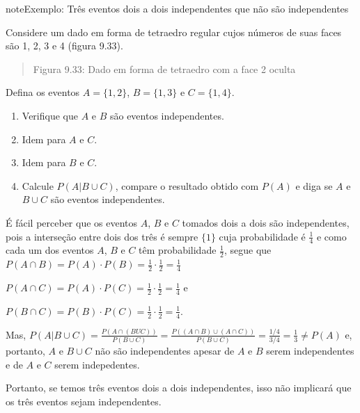 \begin{sphinxadmonition}{note}{Exemplo: Três eventos dois a dois independentes que não são independentes}

Considere um dado em forma de tetraedro regular cujos números de suas faces são 1, 2, 3 e 4 (figura 9.33).
\begin{quote}
\label{\detokenize{PE511-7:id4}}
\begin{figure}[H]
\centering

\noindent{}
\label{\detokenize{PE511-7:id4}}\end{figure}

Figura 9.33: Dado em forma de tetraedro com a face 2 oculta
\end{quote}

Defina os eventos \(A=\{1,2\}\), \(B=\{1,3\}\) e \(C=\{1,4\}\).
\begin{enumerate}
\item {} 
Verifique que \(A\) e \(B\)  são eventos independentes.

\item {} 
Idem para \(A\) e \(C\).

\item {} 
Idem para \(B\) e \(C\).

\item {} 
Calcule \(P(A|B\cup C)\), compare o resultado obtido com \(P(A)\) e diga se \(A\) e \(B\cup C\) são eventos independentes.

\end{enumerate}

É fácil perceber que os eventos \(A\), \(B\) e \(C\) tomados dois a dois são independentes, pois a interseção entre dois dos três é sempre \(\{1\}\) cuja probabilidade é \(\frac{1}{4}\) e como cada um dos eventos \(A\), \(B\) e \(C\) têm probabilidade \(\frac{1}{2}\), segue que
\(P(A\cap B)=P(A)\cdot P(B)=\frac{1}{2}\cdot\frac{1}{2}=\frac{1}{4}\)

\(P(A\cap C)=P(A) \cdot P(C)=\frac{1}{2}\cdot\frac{1}{2}=\frac{1}{4}\) e

\(P(B\cap C)=P(B)\cdot P(C)=\frac{1}{2}\cdot\frac{1}{2}=\frac{1}{4}\).

Mas, \(P(A|B\cup C)=\frac{P(A\cap (BUC))}{P(B\cup C)}=\frac{P((A\cap B)\cup (A\cap C))}{P(B\cup C)}=\frac{1/4}{3/4}=\frac{1}{3}\neq P(A)\) e, portanto, \(A\) e \(B\cup C\)  não são independentes apesar de \(A\) e \(B\) serem independentes e de \(A\) e \(C\) serem indepedentes.

Portanto, se temos três eventos dois a dois independentes, isso não implicará que os três eventos sejam independentes.
\end{sphinxadmonition}


